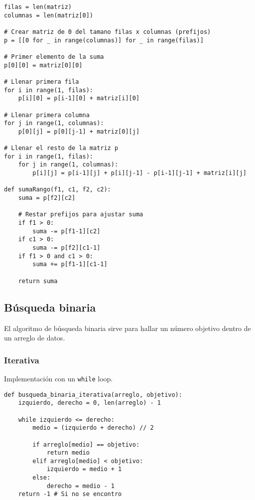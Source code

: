 \documentclass[12pt,letterpaper]{article}
\begin{document}
\begin{verbatim}
filas = len(matriz)
columnas = len(matriz[0])

# Crear matriz de 0 del tamano filas x columnas (prefijos)
p = [[0 for _ in range(columnas)] for _ in range(filas)]

# Primer elemento de la suma
p[0][0] = matriz[0][0]

# Llenar primera fila
for i in range(1, filas):
    p[i][0] = p[i-1][0] + matriz[i][0]

# Llenar primera columna
for j in range(1, columnas):
    p[0][j] = p[0][j-1] + matriz[0][j]

# Llenar el resto de la matriz p
for i in range(1, filas):
    for j in range(1, columnas):
        p[i][j] = p[i-1][j] + p[i][j-1] - p[i-1][j-1] + matriz[i][j]

def sumaRango(f1, c1, f2, c2):
    suma = p[f2][c2]

    # Restar prefijos para ajustar suma
    if f1 > 0:
        suma -= p[f1-1][c2]
    if c1 > 0:
        suma -= p[f2][c1-1]
    if f1 > 0 and c1 > 0:
        suma += p[f1-1][c1-1]

    return suma
\end{verbatim}

\subsection{Búsqueda binaria}

El algoritmo de búsqueda binaria sirve para hallar un número objetivo dentro de un arreglo de datos.

\subsubsection{Iterativa}

Implementación con un \texttt{while} loop.

\begin{verbatim}
def busqueda_binaria_iterativa(arreglo, objetivo):
    izquierdo, derecho = 0, len(arreglo) - 1

    while izquierdo <= derecho:
        medio = (izquierdo + derecho) // 2

        if arreglo[medio] == objetivo:
            return medio
        elif arreglo[medio] < objetivo:
            izquierdo = medio + 1
        else:
            derecho = medio - 1
    return -1 # Si no se encontro
\end{verbatim}
\end{document}
